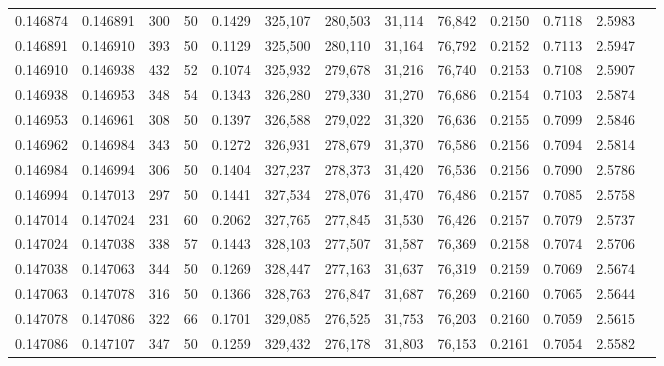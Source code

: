 \begin{tabular}{rrrrrrrrrrrrr}
0.146874 & 0.146891 &   300 &  50 &                                     0.1429 & 325,107 & 280,503 &  31,114 &  76,842 & 0.2150 & 0.7118 & 2.5983 \\
0.146891 & 0.146910 &   393 &  50 &                                     0.1129 & 325,500 & 280,110 &  31,164 &  76,792 & 0.2152 & 0.7113 & 2.5947 \\
0.146910 & 0.146938 &   432 &  52 &                                     0.1074 & 325,932 & 279,678 &  31,216 &  76,740 & 0.2153 & 0.7108 & 2.5907 \\
0.146938 & 0.146953 &   348 &  54 &                                     0.1343 & 326,280 & 279,330 &  31,270 &  76,686 & 0.2154 & 0.7103 & 2.5874 \\
0.146953 & 0.146961 &   308 &  50 &                                     0.1397 & 326,588 & 279,022 &  31,320 &  76,636 & 0.2155 & 0.7099 & 2.5846 \\
0.146962 & 0.146984 &   343 &  50 &                                     0.1272 & 326,931 & 278,679 &  31,370 &  76,586 & 0.2156 & 0.7094 & 2.5814 \\
0.146984 & 0.146994 &   306 &  50 &                                     0.1404 & 327,237 & 278,373 &  31,420 &  76,536 & 0.2156 & 0.7090 & 2.5786 \\
0.146994 & 0.147013 &   297 &  50 &                                     0.1441 & 327,534 & 278,076 &  31,470 &  76,486 & 0.2157 & 0.7085 & 2.5758 \\
0.147014 & 0.147024 &   231 &  60 &                                     0.2062 & 327,765 & 277,845 &  31,530 &  76,426 & 0.2157 & 0.7079 & 2.5737 \\
0.147024 & 0.147038 &   338 &  57 &                                     0.1443 & 328,103 & 277,507 &  31,587 &  76,369 & 0.2158 & 0.7074 & 2.5706 \\
0.147038 & 0.147063 &   344 &  50 &                                     0.1269 & 328,447 & 277,163 &  31,637 &  76,319 & 0.2159 & 0.7069 & 2.5674 \\
0.147063 & 0.147078 &   316 &  50 &                                     0.1366 & 328,763 & 276,847 &  31,687 &  76,269 & 0.2160 & 0.7065 & 2.5644 \\
0.147078 & 0.147086 &   322 &  66 &                                     0.1701 & 329,085 & 276,525 &  31,753 &  76,203 & 0.2160 & 0.7059 & 2.5615 \\
0.147086 & 0.147107 &   347 &  50 &                                     0.1259 & 329,432 & 276,178 &  31,803 &  76,153 & 0.2161 & 0.7054 & 2.5582 \\

\end{tabular}
